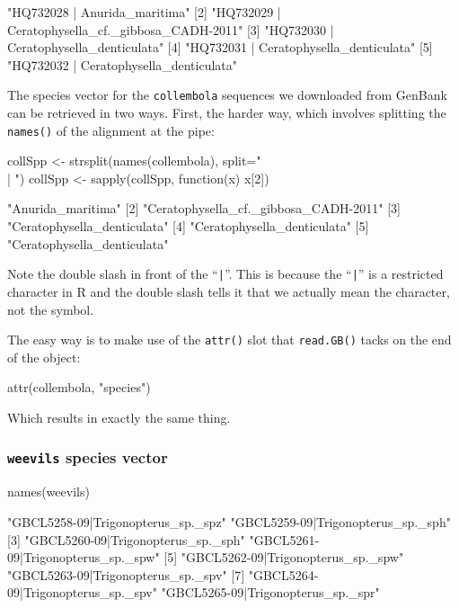 \documentclass{article}
\newcommand{\progname}[1]{\textsc{#1}}
\newcommand{\fun}[1]{\texttt{#1}}
\begin{document}
\begin{Routput}
 [1] "HQ732028 | Anurida_maritima"                    
 [2] "HQ732029 | Ceratophysella_cf._gibbosa_CADH-2011"
 [3] "HQ732030 | Ceratophysella_denticulata"          
 [4] "HQ732031 | Ceratophysella_denticulata"          
 [5] "HQ732032 | Ceratophysella_denticulata" 
\end{Routput}

The species vector for the \fun{collembola} sequences we downloaded from GenBank can be retrieved in two ways. First, the harder way, which involves splitting the \fun{names()} of the alignment at the pipe:

\begin{console}
collSpp <- strsplit(names(collembola), split=" \\| ")
collSpp <- sapply(collSpp, function(x) x[2])
\end{console}

\begin{Routput}
 [1] "Anurida_maritima"                    
 [2] "Ceratophysella_cf._gibbosa_CADH-2011"
 [3] "Ceratophysella_denticulata"          
 [4] "Ceratophysella_denticulata"          
 [5] "Ceratophysella_denticulata" 
\end{Routput}

Note the double slash in front of the ``\verb+|+''. This is because the ``\verb+|+'' is a restricted character in \progname{R} and the double slash tells it that we actually mean the character, not the symbol.

The easy way is to make use of the \fun{attr()} slot that \fun{read.GB()} tacks on the end of the object:

\begin{console}
attr(collembola, "species")
\end{console}

Which results in exactly the same thing. 

\subsubsection{\fun{weevils} species vector}

\begin{console}
names(weevils)
\end{console}

\begin{Routput}
  [1] "GBCL5258-09|Trigonopterus_sp._spz"  "GBCL5259-09|Trigonopterus_sp._sph" 
  [3] "GBCL5260-09|Trigonopterus_sp._sph"  "GBCL5261-09|Trigonopterus_sp._spw" 
  [5] "GBCL5262-09|Trigonopterus_sp._spw"  "GBCL5263-09|Trigonopterus_sp._spv" 
  [7] "GBCL5264-09|Trigonopterus_sp._spv"  "GBCL5265-09|Trigonopterus_sp._spr"
\end{Routput}
\end{document}
